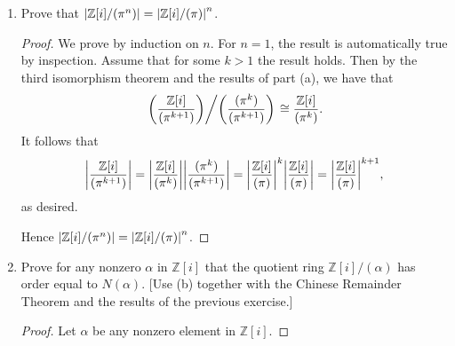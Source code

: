 \documentclass[11pt]{article}
\newcommand{\br}[1]{\left(#1\right)}
\begin{document}
\begin{enumerate}
\begin{enumerate}
\begin{proof}
            Consider the map $\varphi\colon \mathbb{Z}[i]\to (\pi^{n})$ given by $r\mapsto r\pi^n$ and the projection map (which is surjective) $\pi^{\prime}\colon (\pi^{n})\to (\pi^n)/(\pi^{n+1})$. View these maps as group homomorphisms: We check that $\varphi$ is an additive group homomorphism. For elements $r,s\in \mathbb{Z}[i]$ we have that $r+s\mapsto (r+s)\pi^n = r\pi^n + s\pi^n$, which is $\varphi(r) + \varphi(s)$ as desired. We also have that $\varphi$ is surjective because $(\pi^n)$ by definition is the set of all multiples of $\pi^n$. Multiplication by $\pi^n$ does not preserve the ring multiplication since multiplication only distributes over addition.

            The composition $\pi^{\prime}\circ \varphi\colon \mathbb{Z}[i]\to (\pi^n)/(\pi^{n+1})$ is a surjective additive group homomorphism whose kernel is exactly the Gaussian integers which when multiplied by $\pi^n$ give a multiple of $\pi^{n+1}$; i.e. the multiples of $\pi$. Specifically, $a$ is in $\ker(\pi^{\prime}\circ \varphi)$ if and only if $\pi^{n+1}$ divides $a\pi^n$, which because $\pi$ is an irreducible element, we cancel $\pi^n$ and obtain that $\pi$ divides $a$. Hence $\ker(\pi^{\prime}\circ \varphi) = (\pi)$, so by the first isomorphism theorem \[\frac{\mathbb{Z}[i]}{(\pi)}\cong \frac{(\pi^n)}{(\pi^{n+1})}.\]
        \end{proof}
        \item Prove that $\abs{\mathbb{Z}[i]/(\pi^n)} = \abs{\mathbb{Z}[i]/(\pi)}^n$.
        \begin{proof}
            We prove by induction on $n$. For $n = 1$, the result is automatically true by inspection. Assume that for some $k>1$ the result holds. Then by the third isomorphism theorem and the results of part (a), we have that \[\left. \br{\frac{\mathbb{Z}[i]}{(\pi^{k+1})}}\middle/\br{\frac{(\pi^k)}{(\pi^{k+1})}}\right. \cong \frac{\mathbb{Z}[i]}{(\pi^k)}.\] It follows that \[\abs{\frac{\mathbb{Z}[i]}{(\pi^{k+1})}} = \abs{\frac{\mathbb{Z}[i]}{(\pi^k)}}\abs{\frac{(\pi^k)}{(\pi^{k+1})}} = \abs{\frac{\mathbb{Z}[i]}{(\pi)}}^k\abs{\frac{\mathbb{Z}[i]}{(\pi)}} = \abs{\frac{\mathbb{Z}[i]}{(\pi)}}^{k+1},\] as desired.

            Hence $\abs{\mathbb{Z}[i]/(\pi^n)} = \abs{\mathbb{Z}[i]/(\pi)}^n$.
        \end{proof}
        \item Prove for any nonzero $\alpha$ in $\mathbb{Z}[i]$ that the quotient ring $\mathbb{Z}[i]/(\alpha)$ has order equal to $N(\alpha)$. [Use (b) together with the Chinese Remainder Theorem and the results of the previous exercise.]
        \begin{proof} Let $\alpha$ be any nonzero element in $\mathbb{Z}[i]$.


\end{proof}
\end{enumerate}
\end{enumerate}
\end{document}
